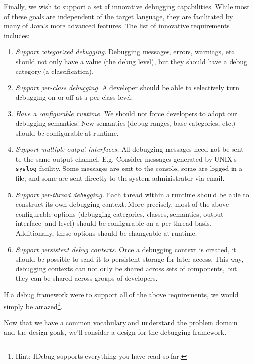 \documentclass{article}
\begin{document}
Finally, we wish to support a set of innovative debugging
capabilities.  While most of these goals are independent of the target
language, they are facilitated by many of Java's more advanced
features.  The list of innovative requirements includes:
\begin{enumerate}
\item \emph{Support categorized debugging.} Debugging messages,
  errors, warnings, etc. should not only have a value (the debug
  level), but they should have a debug category (a classification).
\item \emph{Support per-class debugging.} A developer should be able
  to selectively turn debugging on or off at a per-class level.
\item \emph{Have a configurable runtime.}  We should not force
  developers to adopt our debugging semantics.  New semantics (debug
  ranges, base categories, etc.) should be configurable at runtime.
\item \emph{Support multiple output interfaces.} All debugging
  messages need not be sent to the same output channel.  E.g. Consider
  messages generated by UNIX's \texttt{syslog} facility.  Some
  messages are sent to the console, some are logged in a file, and
  some are sent directly to the system administrator via email.
\item \emph{Support per-thread debugging.} Each thread within a
  runtime should be able to construct its own debugging context.  More
  precisely, most of the above configurable options (debugging
  categories, classes, semantics, output interface, and level) should
  be configurable on a per-thread basis.  Additionally, these options
  should be changeable at runtime.
\item \emph{Support persistent debug contexts.} Once a debugging
  context is created, it should be possible to send it to persistent
  storage for later access.  This way, debugging contexts can not only
  be shared across sets of components, but they can be shared across
  groups of developers.
\end{enumerate}

If a debug framework were to support all of the above requirements, we
would simply be amazed\footnote{Hint: IDebug supports everything you
  have read so far.}.

Now that we have a common vocabulary and understand the problem domain
and the design goals, we'll consider a design for the debugging
framework.

\end{document}
